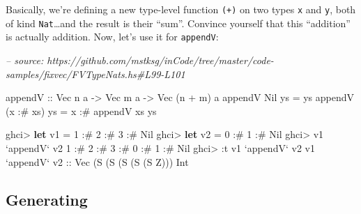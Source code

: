 \documentclass[]{article}
\newenvironment{Shaded}{}{}
\newcommand{\CommentTok}[1]{\textcolor[rgb]{0.38,0.63,0.69}{\textit{#1}}}
\newcommand{\DataTypeTok}[1]{\textcolor[rgb]{0.56,0.13,0.00}{#1}}
\newcommand{\DecValTok}[1]{\textcolor[rgb]{0.25,0.63,0.44}{#1}}
\newcommand{\FunctionTok}[1]{\textcolor[rgb]{0.02,0.16,0.49}{#1}}
\newcommand{\KeywordTok}[1]{\textcolor[rgb]{0.00,0.44,0.13}{\textbf{#1}}}
\newcommand{\NormalTok}[1]{#1}
\newcommand{\OtherTok}[1]{\textcolor[rgb]{0.00,0.44,0.13}{#1}}
\begin{document}
Basically, we're defining a new type-level function \texttt{(+)} on two types
\texttt{x} and \texttt{y}, both of kind \texttt{Nat}\ldots{}and the result is
their ``sum''. Convince yourself that this ``addition'' is actually addition.
Now, let's use it for \texttt{appendV}:

\begin{Shaded}
\begin{Highlighting}[]
\CommentTok{-- source: https://github.com/mstksg/inCode/tree/master/code-samples/fixvec/FVTypeNats.hs#L99-L101}

\OtherTok{appendV ::} \DataTypeTok{Vec}\NormalTok{ n a }\OtherTok{->} \DataTypeTok{Vec}\NormalTok{ m a }\OtherTok{->} \DataTypeTok{Vec}\NormalTok{ (n }\FunctionTok{+}\NormalTok{ m) a}
\NormalTok{appendV }\DataTypeTok{Nil}\NormalTok{       ys }\FunctionTok{=}\NormalTok{ ys}
\NormalTok{appendV (x }\FunctionTok{:#}\NormalTok{ xs) ys }\FunctionTok{=}\NormalTok{ x }\FunctionTok{:#}\NormalTok{ appendV xs ys}
\end{Highlighting}
\end{Shaded}

\begin{Shaded}
\begin{Highlighting}[]
\NormalTok{ghci}\FunctionTok{>} \KeywordTok{let}\NormalTok{ v1 }\FunctionTok{=} \DecValTok{1} \FunctionTok{:#} \DecValTok{2} \FunctionTok{:#} \DecValTok{3} \FunctionTok{:#} \DataTypeTok{Nil}
\NormalTok{ghci}\FunctionTok{>} \KeywordTok{let}\NormalTok{ v2 }\FunctionTok{=} \DecValTok{0} \FunctionTok{:#} \DecValTok{1} \FunctionTok{:#} \DataTypeTok{Nil}
\NormalTok{ghci}\FunctionTok{>}\NormalTok{ v1 }\OtherTok{`appendV`}\NormalTok{ v2}
\DecValTok{1} \FunctionTok{:#} \DecValTok{2} \FunctionTok{:#} \DecValTok{3} \FunctionTok{:#} \DecValTok{0} \FunctionTok{:#} \DecValTok{1} \FunctionTok{:#} \DataTypeTok{Nil}
\NormalTok{ghci}\FunctionTok{>} \FunctionTok{:}\NormalTok{t v1 }\OtherTok{`appendV`}\NormalTok{ v2}
\NormalTok{v1 }\OtherTok{`appendV` v2 ::} \DataTypeTok{Vec}\NormalTok{ (}\DataTypeTok{S}\NormalTok{ (}\DataTypeTok{S}\NormalTok{ (}\DataTypeTok{S}\NormalTok{ (}\DataTypeTok{S}\NormalTok{ (}\DataTypeTok{S} \DataTypeTok{Z}\NormalTok{))) }\DataTypeTok{Int}
\end{Highlighting}
\end{Shaded}

\hypertarget{generating}{%
\subsection{Generating}\label{generating}}
\end{document}
